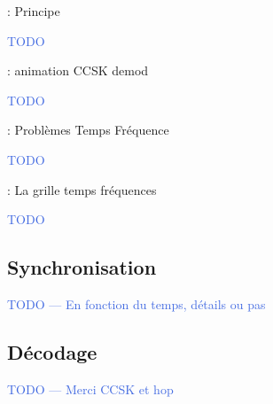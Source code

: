 \documentclass[../main.tex]{subfiles}
\begin{document}
\begin{frame}{\subsecname : {Principe}}
  \begin{center}
    \textcolor{RoyalBlue}{TODO}
  \end{center}
\end{frame}


\begin{frame}{\subsecname : {animation CCSK demod}}
  \begin{center}
    \textcolor{RoyalBlue}{TODO}
  \end{center}
\end{frame}

\begin{frame}{\subsecname : {Problèmes Temps Fréquence}}
  \begin{center}
    \textcolor{RoyalBlue}{TODO}
  \end{center}
\end{frame}


\begin{frame}{\subsecname : {La grille temps fréquences}}
  \begin{center}
    \textcolor{RoyalBlue}{TODO}
  \end{center}
\end{frame}

\subsection{Synchronisation}

\begin{frame}{\subsecname}
  \begin{center}
    \textcolor{RoyalBlue}{TODO --- En fonction du temps, détails ou pas}
  \end{center}
\end{frame}

\subsection{Décodage}

\begin{frame}{\subsecname}
  \begin{center}
    \textcolor{RoyalBlue}{TODO --- Merci CCSK et hop}
  \end{center}
\end{frame}
\end{document}

